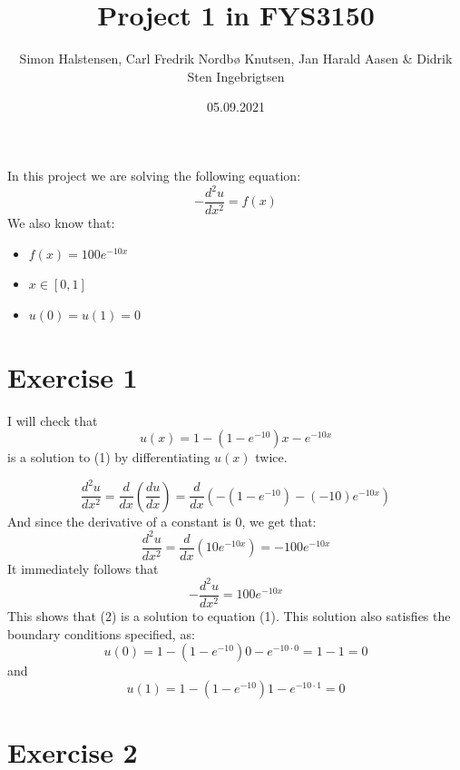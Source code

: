 \documentclass[11pt]{article} %
\title{Project 1 in FYS3150}
\author{Simon Halstensen, Carl Fredrik Nordbø Knutsen, Jan Harald Aasen \& Didrik Sten Ingebrigtsen}
\date{05.09.2021} %
\begin{document}
\maketitle
In this project we are solving the following equation:
\begin{equation} - \dfrac{d^2u}{dx^2} = f(x) \end{equation}
We also know that:
\begin{itemize}
	\item \(f(x) = 100e^{-10x}\)
	\item \(x \in [0, 1]\)
	\item \(u(0)=u(1)=0\)
\end{itemize}

\section*{Exercise 1}


I will check that 
\begin{equation}  u(x) = 1 - (1- e^{-10})x -e^{-10x} \end{equation}
is a solution to (1) by differentiating \(u(x)\) twice. 

\[\dfrac{d^2u}{dx^2} =\dfrac{d}{dx}(\dfrac{du}{dx}) = \dfrac{d}{dx}( -(1 - e^{-10}) - (-10)e^{-10x})\]
And since the derivative of a constant is 0, we get that: 
\[\dfrac{d^2u}{dx^2} = \dfrac{d}{dx}(10e^{-10x}) = -100e^{-10x}\]
It immediately follows that
\[ - \dfrac{d^2u}{dx^2} = 100e^{-10x}\]
This shows that (2) is a solution to equation (1).
This solution also satisfies the boundary conditions specified, as:
\[u(0) = 1 - (1- e^{-10})0 -e^{-10\cdot 0} = 1-1 = 0\]
and
\[u(1) = 1 - (1- e^{-10})1 -e^{-10\cdot 1} = 0\]

\section*{Exercise 2}
\end{document}
